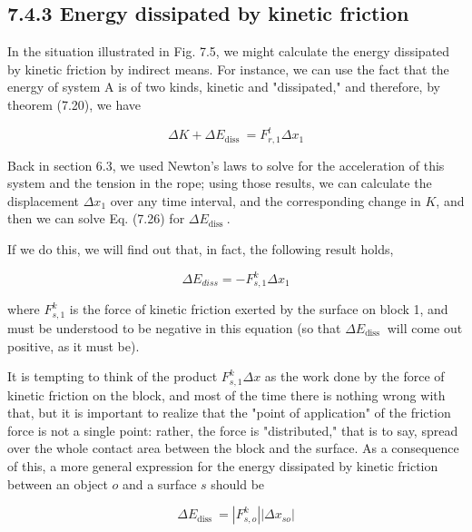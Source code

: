 \documentclass[10pt]{article}
\begin{document}
\subsection*{7.4.3 Energy dissipated by kinetic friction}
In the situation illustrated in Fig. 7.5, we might calculate the energy dissipated by kinetic friction by indirect means. For instance, we can use the fact that the energy of system A is of two kinds, kinetic and "dissipated," and therefore, by theorem (7.20), we have


\begin{equation*}
\Delta K+\Delta E_{\text {diss }}=F_{r, 1}^{t} \Delta x_{1} \tag{7.26}
\end{equation*}


Back in section 6.3, we used Newton's laws to solve for the acceleration of this system and the tension in the rope; using those results, we can calculate the displacement $\Delta x_{1}$ over any time interval, and the corresponding change in $K$, and then we can solve Eq. (7.26) for $\Delta E_{\text {diss }}$.

If we do this, we will find out that, in fact, the following result holds,


\begin{equation*}
\Delta E_{d i s s}=-F_{s, 1}^{k} \Delta x_{1} \tag{7.27}
\end{equation*}


where $F_{s, 1}^{k}$ is the force of kinetic friction exerted by the surface on block 1, and must be understood to be negative in this equation (so that $\Delta E_{\text {diss }}$ will come out positive, as it must be).

It is tempting to think of the product $F_{s, 1}^{k} \Delta x$ as the work done by the force of kinetic friction on the block, and most of the time there is nothing wrong with that, but it is important to realize that the "point of application" of the friction force is not a single point: rather, the force is "distributed," that is to say, spread over the whole contact area between the block and the surface. As a consequence of this, a more general expression for the energy dissipated by kinetic friction between an object $o$ and a surface $s$ should be


\begin{equation*}
\Delta E_{\text {diss }}=\left|F_{s, o}^{k}\right|\left|\Delta x_{s o}\right| \tag{7.28}
\end{equation*}
\end{document}
